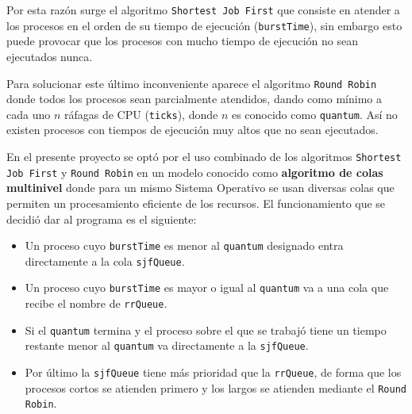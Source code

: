 Por esta razón surge el algoritmo \texttt{Shortest Job First} que consiste en atender a los procesos en el orden de su tiempo de ejecución (\texttt{burstTime}), sin embargo esto puede provocar que los procesos con mucho tiempo de ejecución no sean ejecutados nunca.

Para solucionar este último inconveniente aparece el algoritmo \texttt{Round Robin} donde todos los procesos sean parcialmente atendidos, dando como mínimo a cada uno $n$ ráfagas de CPU (\texttt{ticks}), donde $n$ es conocido como \texttt{quantum}. Así no existen procesos con tiempos de ejecución muy altos que no sean ejecutados.

En el presente proyecto se optó por el uso combinado de los algoritmos \texttt{Shortest Job First} y \texttt{Round Robin} en un modelo conocido como \textbf{algoritmo de colas multinivel} donde para un mismo Sistema Operativo se usan diversas colas que permiten un procesamiento eficiente de los recursos. El funcionamiento que se decidió dar al programa es el siguiente:

\begin{itemize}
    \item Un proceso cuyo \texttt{burstTime} es menor al \texttt{quantum} designado entra directamente a la cola \texttt{sjfQueue}.
    \item Un proceso cuyo \texttt{burstTime} es mayor o igual al \texttt{quantum} va a una cola que recibe el nombre de \texttt{rrQueue}.
    \item Si el \texttt{quantum} termina y el proceso sobre el que se trabajó tiene un tiempo restante menor al \texttt{quantum} va directamente a la \texttt{sjfQueue}.
    \item Por último la \texttt{sjfQueue} tiene más prioridad que la \texttt{rrQueue}, de forma que los procesos cortos se atienden primero y los largos se atienden mediante el \texttt{Round Robin}.
\end{itemize}

